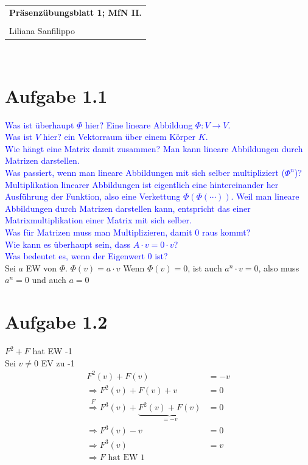 \documentclass{article} %
\newcommand{\titulo}{Präsenzübungsblatt 1; MfN II.}
\newcommand{\nombre}{Liliana Sanfilippo}
\begin{document}
\begin{tabular}{p{12cm}}
{{\Large\bf\titulo}}\\
\vspace{0.2cm}\\
 {\large\nombre}\\
\end{tabular}
\vspace{0.2cm}\\
\section{Aufgabe 1.1}
\textcolor{Blue}{Was ist überhaupt $\Phi$ hier? Eine lineare Abbildung $\Phi: V \rightarrow V$. \\
Was ist $V$ hier? ein Vektorraum über einem Körper $K$. \\
Wie hängt eine Matrix damit zusammen? Man kann lineare Abbildungen durch Matrizen darstellen. \\
Was passiert, wenn man lineare Abbildungen mit sich selber multipliziert ($\Phi^n$)? Multiplikation linearer Abbildungen ist eigentlich eine hintereinander her Ausführung der Funktion, also eine Verkettung $\Phi(\Phi(\cdots))$. Weil man lineare Abbildungen durch Matrizen darstellen kann, entspricht das einer Matrixmultiplikation einer Matrix mit sich selber. \\
Was für Matrizen muss man Multiplizieren, damit 0 raus kommt? \\
Wie kann es überhaupt sein, dass $A \cdot v = 0 \cdot v $? \\
Was bedeutet es, wenn der Eigenwert 0 ist? 
} \\
Sei $a$ EW von $\Phi$.
$\Phi(v) = a \cdot v$
Wenn $\Phi(v) = 0$, ist auch $a^n \cdot v = 0$, also muss $a^n = 0$ und auch $a = 0$
\section{Aufgabe 1.2}
$F^2 + F$ hat EW -1 \\
Sei $v \neq 0$ EV zu -1 \\
\begin{align*}
    F^2(v) + F(v) & = -v  \\
    \Rightarrow F^2(v) + F(v) + v & = 0 \\
    \overset{F}{\Rightarrow} F^3(v) + \underbrace{F^2(v) + F(v)}_{=-v} & = 0 \\
    \Rightarrow F^3(v) - v & = 0 \\
    \Rightarrow F^3(v) & = v \\
    \Rightarrow F \text{ hat EW } 1
\end{align*}
\end{document}

